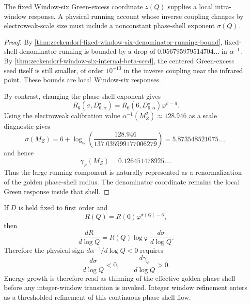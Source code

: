 \begin{theorem}
\label{thm:zeckendorf-phase-shell-exponent-principal-running-coordinate}
The fixed Window-six Green-excess coordinate $z(Q)$ supplies a local
intra-window response. A physical running account whose inverse coupling
changes by electroweak-scale size must include a nonconstant phase-shell
exponent $\sigma(Q)$.
\end{theorem}
\begin{proof}
By
\autoref{thm:zeckendorf-fixed-window-six-denominator-running-bound},
fixed-shell denominator running is bounded by a drop of
$0.056795979514704\ldots$ in $\alpha^{-1}$. By
\autoref{thm:zeckendorf-window-six-internal-beta-seed}, the centered
Green-excess seed itself is still smaller, of order $10^{-13}$ in the
inverse coupling near the infrared point. These bounds are local
Window-six responses.

By contrast, changing the phase-shell exponent gives
$$
  R_6(\sigma,D_{6,\alpha}^{\star})
  =
  R_6(6,D_{6,\alpha}^{\star})\varphi^{\sigma-6}.
$$
Using the electroweak calibration value
$\alpha^{-1}(M_Z^2)\approx128.946$ as a scale diagnostic gives
$$
  \sigma(M_Z)
  =
  6+
  \log_\varphi
  \left(
    \frac{128.946}{137.035999177006279}
  \right)
  =
  5.873548521075\ldots,
$$
and hence
$$
  \gamma_\varphi(M_Z)
  =
  0.126451478925\ldots.
$$
Thus the large running component is naturally represented as a
renormalization of the golden phase-shell radius. The denominator
coordinate remains the local Green response inside that shell.
\end{proof}

\begin{corollary}
\label{cor:zeckendorf-shell-flow-sign}
If $D$ is held fixed to first order and
$$
  R(Q)=R(0)\varphi^{\sigma(Q)-6},
$$
then
$$
  \frac{dR}{d\log Q}
  =
  R(Q)\log\varphi\,
  \frac{d\sigma}{d\log Q}.
$$
Therefore the physical sign
$d\alpha^{-1}/d\log Q<0$ requires
$$
  \frac{d\sigma}{d\log Q}<0,
  \qquad
  \frac{d\gamma_\varphi}{d\log Q}>0.
$$
Energy growth is therefore read as thinning of the effective golden
phase shell before any integer-window transition is invoked. Integer
window refinement enters as a thresholded refinement of this continuous
phase-shell flow.
\end{corollary}

